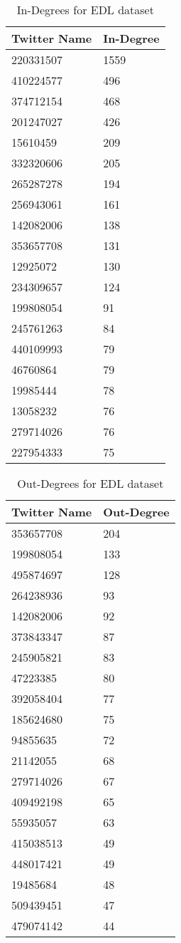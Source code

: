 \begin{table}[htbp]%
\centering
\begin{tabular}{|l|l|}
\hline
Twitter Name & In-Degree \\
\hline
220331507 & 1559 \\
410224577 & 496 \\
374712154 & 468 \\
201247027 & 426 \\
15610459 & 209 \\
332320606 & 205 \\
265287278 & 194 \\
256943061 & 161 \\
142082006 & 138 \\
353657708 & 131 \\
12925072 & 130 \\
234309657 & 124 \\
199808054 & 91 \\
245761263 & 84 \\
440109993 & 79 \\
46760864 & 79 \\
19985444 & 78 \\
13058232 & 76 \\
279714026 & 76 \\
227954333 & 75 \\
\hline
\end{tabular}
\caption{In-Degrees for EDL dataset}
\label{tab:edlin}
\end{table}

\begin{table}[htbp]%
\centering
\begin{tabular}{|l|l|}
\hline
Twitter Name & Out-Degree \\
\hline
353657708 & 204 \\
199808054 & 133 \\
495874697 & 128 \\
264238936 & 93 \\
142082006 & 92 \\
373843347 & 87 \\
245905821 & 83 \\
47223385 & 80 \\
392058404 & 77 \\
185624680 & 75 \\
94855635 & 72 \\
21142055 & 68 \\
279714026 & 67 \\
409492198 & 65 \\
55935057 & 63 \\
415038513 & 49 \\
448017421 & 49 \\
19485684 & 48 \\
509439451 & 47 \\
479074142 & 44 \\
\hline
\end{tabular}
\caption{Out-Degrees for EDL dataset}
\label{tab:edlout}
\end{table}

